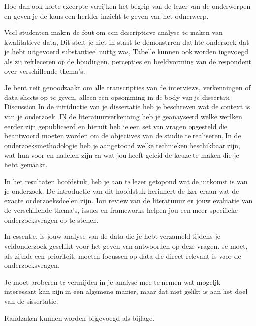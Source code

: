 Hoe dan ook korte excerpte verrijken het begrip van de lezer van de onderwerpen en geven je de kans een herlder inzicht te geven van het odnerwerp.

Veel studenten maken de fout om een descriptieve analyse te maken van kwalitatieve data, Dit stelt je niet in staat te demonstrren dat hte onderzoek dat je hebt uitgevoerd substantieel nuttg was, Tabelle kunnen ook worden ingevoegd als zij refrleceren op de houdingen, percepties en beeldvorming van de respondent over verschillende thema's.



Je bent neit genoodzaakt om alle transcripties van de interviews, verkenningen of data sheets op te geven.  alleen een opsomming in de body van  je dissertati
Discussion
In de intriductie van je dissertatie heb je beschreven wat de context is van je onderzoek. IN de literatuurverkenning heb je geanayseerd welke werlken eerder zijn gepubliceerd en hieruit heb je een set van vragen opgesteld die beantwoord moeten worden om de objectives van de studie te realiseren. In de onderzoeksmethodologie heb je aangetoond welke technieken beschikbaar zijn, wat hun voor en nadelen zijn  en wat jou heeft geleid de keuze te maken die je hebt gemaakt.


In het resultaten hoofdstuk, heb je aan te lezer getopond wat de uitkomst is van je onderzoek. De introductie van dit hoofdstuk herinnert de lzer eraan wat de exacte onderzoeksdoelen zijn. Jou review van de literatuuur en jouw evaluatie van de verschillende thema's, issues en frameworks helpen jou  een meer specifieke onderzoeksvragen op te stellen.

In essentie, is jouw analyse van de data die je hebt verzameld tijdens je veldonderzoek geschikt voor het geven van antwoorden op deze vragen. Je moet, als zijnde een prioriteit,   moeten focussen op data die direct relevant is voor de onderzoeksvragen.

Je moet proberen te vermijden in je analyse mee te nemen wat mogeljk interessant kan zijn in een algemene manier, maar dat niet gelikt is aan het doel van de sissertatie.

Randzaken kunnen worden bijgevoegd als bijlage.
 




